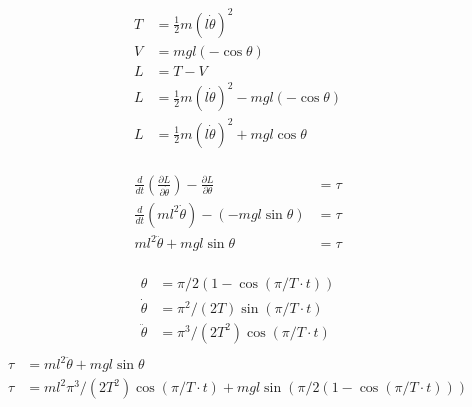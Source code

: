 \begin{solutionbox}[Q1-5]
    \begin{align*}
        T & = \frac{1}{2} m \left(l\dot{\theta}\right)^2                    \\
        V & = mgl(-\cos\theta)                                              \\
        L & = T-V                                                           \\
        L & = \frac{1}{2} m \left(l\dot{\theta}\right)^2 - mgl(-\cos\theta) \\
        L & = \frac{1}{2} m \left(l\dot{\theta}\right)^2  +mgl\cos\theta    \\
    \end{align*}

    \begin{align*}
        \frac{d}{dt} \left( \frac{\partial L}{\partial \dot{\theta}} \right) - \frac{\partial L}{\partial \theta} & = \tau \\
        \frac{d}{dt} \left( ml^2\dot{\theta} \right) - (-mgl\sin\theta)                                           & = \tau \\
        ml^2\ddot{\theta} + mgl\sin\theta                                                                         & = \tau \\
    \end{align*}
\end{solutionbox}

\begin{solutionbox}[Q1-6]
    \begin{align*}
        \theta        & = \pi/2 (1-\cos\left(\pi/T \cdot t\right))    \\
        \dot{\theta}  & = \pi^2/(2T) \sin\left(\pi/T \cdot t\right)   \\
        \ddot{\theta} & = \pi^3/(2T^2) \cos\left(\pi/T \cdot t\right) \\
    \end{align*}
    \begin{align*}
        \tau & = ml^2\ddot{\theta} + mgl\sin\theta                                                                                \\
        \tau & = ml^2 \pi^3/(2T^2) \cos\left(\pi/T \cdot t\right) + mgl\sin\left(\pi/2 (1-\cos\left(\pi/T \cdot t\right)) \right) \\
    \end{align*}
\end{solutionbox}

